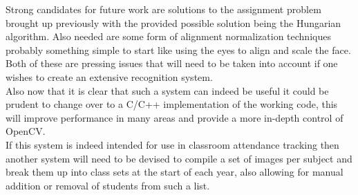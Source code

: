 Strong candidates for future work are solutions to the assignment problem brought up previously  with the 
provided possible solution being the Hungarian algorithm.  Also needed are some form of alignment normalization 
techniques probably something simple to start like using the eyes to align and scale the face.  Both of these 
are pressing issues that will need to be taken into account if one wishes to create an extensive recognition 
system.  \\

Also now that it is clear that such a system can indeed be useful it could be prudent to change over to a C/C++ 
implementation of the working code, this will improve performance in many areas and provide a more in-depth 
control of OpenCV.  \\

If this system is indeed intended for use in classroom attendance tracking then another system will need to 
be devised to compile a set of images per subject and break them up into class sets at the start of each year, 
also allowing for manual addition or removal of students from such a list.

